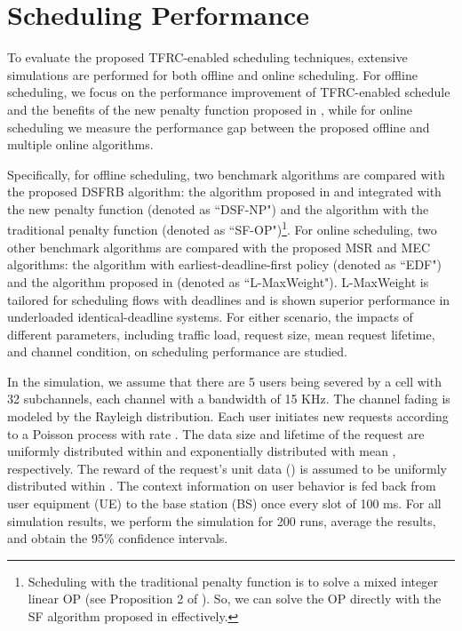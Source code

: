 \documentclass[journal,letterpaper,12pt,oneside,onecolumn,draftclsnofoot]{IEEEtran}
\begin{document}
\section{Scheduling Performance}

To evaluate the proposed TFRC-enabled scheduling techniques,  extensive simulations are performed for both offline and online scheduling.
For offline scheduling, we focus on the performance improvement of TFRC-enabled schedule and the benefits of the new penalty function proposed in \cite{Shan_TWC_submitted}, while for online scheduling we measure the performance gap between the proposed offline and multiple online algorithms.

Specifically, for offline scheduling, two benchmark algorithms are compared with the proposed DSFRB algorithm: the algorithm proposed in \cite{1zhang} and integrated with the new penalty function (denoted as ``DSF-NP") and the algorithm with the traditional penalty function (denoted as ``SF-OP")\footnote{Scheduling with the traditional penalty function is to solve a mixed integer linear OP (see Proposition 2 of \cite{Shan_TWC_submitted}). So, we can solve the OP directly with the SF algorithm proposed in \cite{Shan_TWC_submitted} effectively.}.
For online scheduling, two other benchmark algorithms are compared with the proposed MSR and MEC algorithms: the algorithm with earliest-deadline-first policy (denoted as ``EDF") and the algorithm proposed in \cite{Wu_WCNC13} (denoted as ``L-MaxWeight"). L-MaxWeight is tailored for scheduling flows with deadlines and is shown superior performance in underloaded identical-deadline systems.
For either  scenario, the impacts of different parameters, including traffic load, request size, mean request lifetime, and channel condition, on scheduling performance are studied.


In the simulation, we assume that there are 5 users being severed by a cell with 32 subchannels, each channel with a bandwidth of 15 KHz.
The channel fading is modeled by the Rayleigh distribution.
Each user initiates new requests according to a Poisson process with rate .
The data size  and lifetime  of the  request are uniformly distributed within  and  exponentially distributed with mean , respectively.
The reward of the request's unit data () is assumed to be uniformly distributed within .
The context information on user behavior is fed back from user equipment (UE) to the base station (BS) once every slot of 100 ms.
For all simulation results, we perform the simulation for 200 runs, average the results, and obtain the 95\% confidence intervals.
\end{document}
